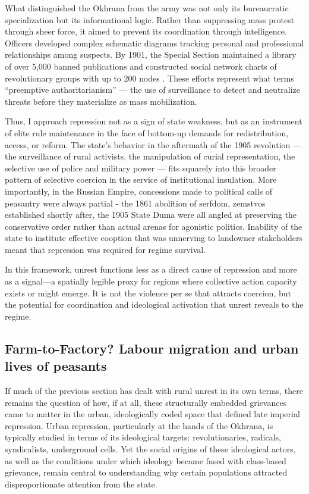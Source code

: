 \documentclass[11pt]{scrarticle}
\begin{document}
What distinguished the Okhrana from the army was not only its bureaucratic specialization but its informational logic. Rather than suppressing mass protest through sheer force, it aimed to prevent its coordination through intelligence. Officers developed complex schematic diagrams tracking personal and professional relationships among suspects. By 1901, the Special Section maintained a library of over 5,000 banned publications and constructed social network charts of revolutionary groups with up to 200 nodes \parencite{daly_autocracy_1998}. These efforts represent what \cite{dimitrov_why_2013} terms ``preemptive authoritarianism'' — the use of surveillance to detect and neutralize threats before they materialize as mass mobilization.

Thus, I approach repression not as a sign of state weakness, but as an instrument of elite rule maintenance in the face of bottom-up demands for redistribution, access, or reform. The state’s behavior in the aftermath of the 1905 revolution — the surveillance of rural activists, the manipulation of curial representation, the selective use of police and military power — fits squarely into this broader pattern of selective coercion in the service of institutional insulation. More importantly, in the Russian Empire, concessions made to political calls of peasantry were always partial - the 1861 abolition of serfdom, zemstvos established shortly after, the 1905 State Duma were all angled at preserving the conservative order rather than actual arenas for agonistic politics. Inability of the state to institute effective cooption that was unnerving to landowner stakeholders meant that repression was required for regime survival.

In this framework, unrest functions less as a direct cause of repression and more as a signal—a spatially legible proxy for regions where collective action capacity exists or might emerge. It is not the violence per se that attracts coercion, but the potential for coordination and ideological activation that unrest reveals to the regime.

\subsection{Farm-to-Factory? Labour migration and urban lives of peasants}

If much of the previous section has dealt with rural unrest in its own terms, there remains the question of how, if at all, these structurally embedded grievances came to matter in the urban, ideologically coded space that defined late imperial repression. Urban repression, particularly at the hands of the Okhrana, is typically studied in terms of its ideological targets: revolutionaries, radicals, syndicalists, underground cells. Yet the social origins of these ideological actors, as well as the conditions under which ideology became fused with class-based grievance, remain central to understanding why certain populations attracted disproportionate attention from the state.
\end{document}
